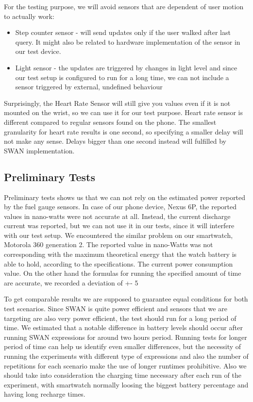 For the testing purpose, we will avoid sensors that are dependent of user motion to actually work: 
\begin{itemize}
 \item Step counter sensor - will send updates only if the user walked after last query. It might also be related to hardware implementation of the sensor in our test device. 
 \item Light sensor - the updates are triggered by changes in light level and since our test setup is configured to run for a long time, we can not include a sensor triggered by external,
 undefined behaviour
\end{itemize}

Surprisingly, the Heart Rate Sensor will still give you values even if it is not mounted on the wrist, so we can use it for our test purpose. 
Heart rate sensor is different compared to regular sensors found on the phone. The smallest granularity for heart rate results is one second,
so specifying a smaller delay will not make any sense.  Delays bigger than one second instead will fulfilled by SWAN implementation.
 
 \subsection{Preliminary Tests}
Preliminary tests shows us that we can not rely on the estimated power reported by the fuel gauge sensors. In case of our phone device,
Nexus 6P, the reported values in nano-watts were not accurate at all. Instead, the current discharge current was reported, 
but we can not use it in our tests, since it will interfere with our test setup.
We encountered the similar problem on our smartwatch, Motorola 360 generation 2. 
The reported value in nano-Watts was not corresponding with the maximum theoretical energy that the watch battery is able to hold, according to the specifications.
The current power consumption value.
On the other hand the formulas for running the specified amount of time are accurate, we recorded a deviation of +- 5%

To get comparable results we are supposed to guarantee equal conditions for both test scenarios.
Since SWAN is quite power efficient and sensors that we are targeting are also very power efficient, the test should run for a long period of time.
We estimated that a notable difference in battery levels should occur after running SWAN expressions for around two hours period.
Running tests for longer period of time can help us identify even smaller differences, 
but the necessity of running the experiments with different type of expressions and also the number of repetitions for each scenario make the use of longer runtimes prohibitive.
Also we should take into consideration the charging time necessary after each run of the experiment,
with smartwatch normally loosing the biggest battery percentage  and having long recharge times.

